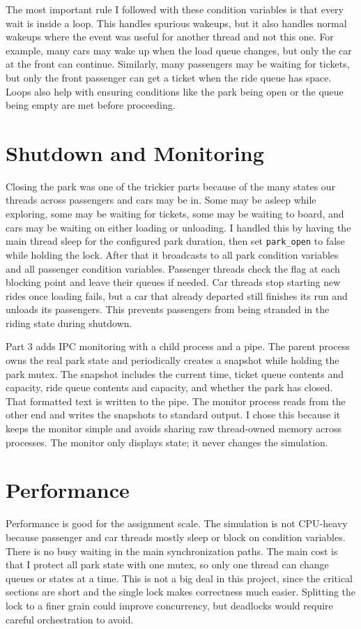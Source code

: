 \documentclass[12pt]{article}
\begin{document}
The most important rule I followed with these condition variables is that every wait is inside a loop. This handles spurious wakeups, but it also handles normal wakeups where the event was useful for another thread and not this one. For example, many cars may wake up when the load queue changes, but only the car at the front can continue. Similarly, many passengers may be waiting for tickets, but only the front passenger can get a ticket when the ride queue has space. Loops also help with ensuring conditions like the park being open or the queue being empty are met before proceeding.

\section{Shutdown and Monitoring}
Closing the park was one of the trickier parts because of the many states our threads across passengers and cars may be in. Some may be asleep while exploring, some may be waiting for tickets, some may be waiting to board, and cars may be waiting on either loading or unloading. I handled this by having the main thread sleep for the configured park duration, then set \lstinline[language=C]|park_open| to false while holding the lock. After that it broadcasts to all park condition variables and all passenger condition variables. Passenger threads check the flag at each blocking point and leave their queues if needed. Car threads stop starting new rides once loading fails, but a car that already departed still finishes its run and unloads its passengers. This prevents passengers from being stranded in the riding state during shutdown.

Part 3 adds IPC monitoring with a child process and a pipe. The parent process owns the real park state and periodically creates a snapshot while holding the park mutex. The snapshot includes the current time, ticket queue contents and capacity, ride queue contents and capacity, and whether the park has closed. That formatted text is written to the pipe. The monitor process reads from the other end and writes the snapshots to standard output. I chose this because it keeps the monitor simple and avoids sharing raw thread-owned memory across processes. The monitor only displays state; it never changes the simulation.

\section{Performance}
Performance is good for the assignment scale. The simulation is not CPU-heavy because passenger and car threads mostly sleep or block on condition variables. There is no busy waiting in the main synchronization paths. The main cost is that I protect all park state with one mutex, so only one thread can change queues or states at a time. This is not a big deal in this project, since the critical sections are short and the single lock makes correctness much easier. Splitting the lock to a finer grain could improve concurrency, but deadlocks would require careful orchestration to avoid.
\end{document}

